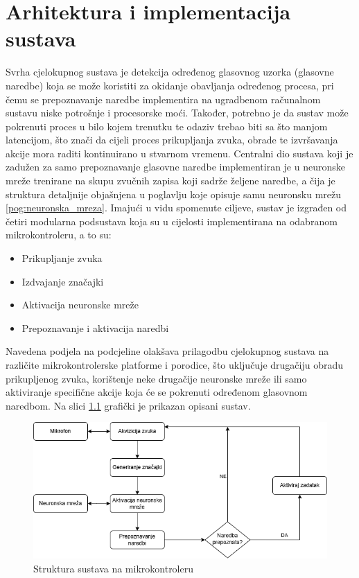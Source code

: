 \chapter{Arhitektura i implementacija sustava}
\label{pog:struktura_sustava}

Svrha cjelokupnog sustava je detekcija određenog glasovnog uzorka (glasovne naredbe) koja se može koristiti za okidanje obavljanja određenog procesa, pri čemu se prepoznavanje naredbe implementira na ugradbenom računalnom sustavu niske potrošnje i procesorske moći. Također, potrebno je da sustav može pokrenuti
proces u bilo kojem trenutku te odaziv trebao biti sa što manjom latencijom, što
znači da cijeli proces prikupljanja zvuka, obrade te izvršavanja akcije mora raditi
kontinuirano u stvarnom vremenu. Centralni dio sustava koji je zadužen za
samo prepoznavanje glasovne naredbe implementiran je u neuronske
mreže trenirane na skupu zvučnih zapisa koji sadrže željene naredbe, a čija je struktura
detaljnije objašnjena u poglavlju koje opisuje samu neuronsku mrežu \ref{pog:neuronska_mreza}.
Imajući u vidu spomenute ciljeve, sustav je izgrađen od četiri modularna
podsustava koja su u cijelosti implementirana na odabranom mikrokontroleru, a to su:

\begin{itemize}
    \item Prikupljanje zvuka
    \item Izdvajanje značajki 
    \item Aktivacija neuronske mreže
    \item Prepoznavanje i aktivacija naredbi
\end{itemize}

Navedena podjela na podcjeline olakšava prilagodbu cjelokupnog
sustava na različite mikrokontrolerske platforme i porodice, što uključuje drugačiju obradu
prikupljenog zvuka, korištenje neke drugačije neuronske mreže ili samo 
aktiviranje specifične akcije koja će se pokrenuti određenom glasovnom naredbom.
Na slici \ref{pic:struktura_sustava} grafički je prikazan opisani sustav.

\begin{figure}[htb]
    \centering
    \includegraphics[width=1\linewidth]{Chapters/struktura_sustava/struktura_sustava.png} 
    \caption{Struktura sustava na mikrokontroleru\cite{flowchart}}
    \label{pic:struktura_sustava}
\end{figure}






